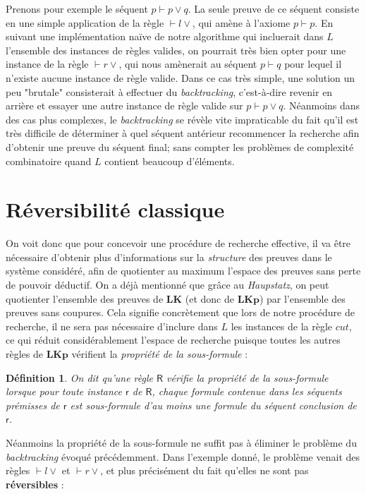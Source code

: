 \documentclass[12pt]{report}
\newcommand{\seq}{\vdash}
\newcommand{\irule}[1]{\footnotesize$#1$}
\newcommand{\iruleR}[1]{\irule{\seq{#1}}}
\newtheorem{definition}{Définition}
\begin{document}
Prenons pour exemple le séquent $p \seq p \lor q$. La seule preuve de ce séquent consiste en une simple application de la règle {\iruleR{l\lor}}, qui amène à l'axiome $p \seq p$. En suivant une implémentation naïve de notre algorithme qui incluerait dans $L$ l'ensemble des instances de règles valides, on pourrait très bien opter pour une instance de la règle {\iruleR{r\lor}}, qui nous amènerait au séquent $p \seq q$ pour lequel il n'existe aucune instance de règle valide. Dans ce cas très simple, une solution un peu "brutale" consisterait à effectuer du \emph{backtracking}, c'est-à-dire revenir en arrière et essayer une autre instance de règle valide sur $p \seq p \lor q$. Néanmoins dans des cas plus complexes, le \emph{backtracking} se révèle vite impraticable du fait qu'il est très difficile de déterminer à quel séquent antérieur recommencer la recherche afin d'obtenir une preuve du séquent final; sans compter les problèmes de complexité combinatoire quand $L$ contient beaucoup d'éléments.

\section{Réversibilité classique}

On voit donc que pour concevoir une procédure de recherche effective, il va être nécessaire d'obtenir plus d'informations sur la \emph{structure} des preuves dans le système considéré, afin de quotienter au maximum l'espace des preuves sans perte de pouvoir déductif. On a déjà mentionné que grâce au \emph{Haupstatz}, on peut quotienter l'ensemble des preuves de $\mathbf{LK}$ (et donc de $\mathbf{LKp}$) par l'ensemble des preuves sans coupures. Cela signifie concrètement que lors de notre procédure de recherche, il ne sera pas nécessaire d'inclure dans $L$ les instances de la règle $cut$, ce qui réduit considérablement l'espace de recherche puisque toutes les autres règles de $\mathbf{LKp}$ vérifient la \emph{propriété de la sous-formule} :

\begin{definition}
    On dit qu'une règle $\mathsf{R}$ vérifie la \emph{propriété de la sous-formule} lorsque pour toute instance $\mathsf{r}$ de $\mathsf{R}$, chaque formule contenue dans les séquents prémisses de $\mathsf{r}$ est sous-formule d'au moins une formule du séquent conclusion de $\mathsf{r}$.
\end{definition}

Néanmoins la propriété de la sous-formule ne suffit pas à éliminer le problème du \emph{backtracking} évoqué précédemment. Dans l'exemple donné, le problème venait des règles {\iruleR{l\lor}} et {\iruleR{r\lor}}, et plus précisément du fait qu'elles ne sont pas \textbf{réversibles} :
\end{document}
